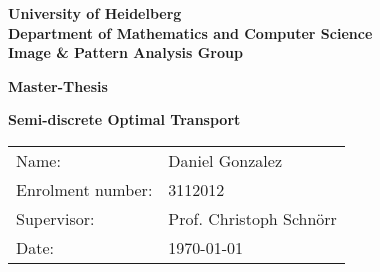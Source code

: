 \documentclass[
     12pt,         %
     a4paper,      %
     BCOR10mm,     %
     DIV14,        %
     ]{scrreprt}
\begin{document}
\begin{titlepage}


\vspace*{1cm}
\begin{center}
\vspace*{3cm}
\textbf{ 
\Large University of Heidelberg \\
\smallskip
\Large Department of Mathematics and Computer Science\\
\smallskip
\Large Image \& Pattern Analysis Group \\
\smallskip
}

\vspace{3cm}

\textbf{\large Master-Thesis} 

\vspace{0.5\baselineskip}
{\huge
\textbf{Semi-discrete Optimal Transport}
}
\end{center}

\vfill 

{\large
\begin{tabular}[l]{ll}
Name: & Daniel Gonzalez\\
Enrolment number: & 3112012\\
Supervisor: & Prof. Christoph Schnörr \\
Date: & \today
\end{tabular}
}

\end{titlepage}
\end{document}
